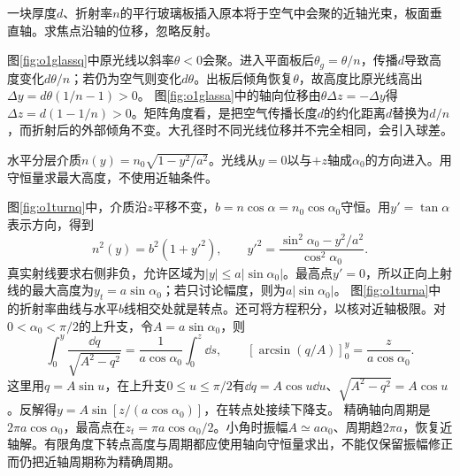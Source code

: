 \begin{exercise}\label{ex:o1glassplate}
一块厚度$d$、折射率$n$的平行玻璃板插入原本将于空气中会聚的近轴光束，板面垂直轴。求焦点沿轴的位移，忽略反射。
\end{exercise}
\begin{solution}
图\ref{fig:o1glassq}中原光线以斜率$\theta<0$会聚。进入平面板后$\theta_g=\theta/n$，传播$d$导致高度变化$d\theta/n$；若仍为空气则变化$d\theta$。出板后倾角恢复$\theta$，故高度比原光线高出$\Delta y=d\theta(1/n-1)>0$。
图\ref{fig:o1glassa}中的轴向位移由$\theta\Delta z=-\Delta y$得$\Delta z=d(1-1/n)>0$。矩阵角度看，是把空气传播长度$d$的约化距离$d$替换为$d/n$，而折射后的外部倾角不变。大孔径时不同光线位移并不完全相同，会引入球差。
\end{solution}

\begin{exercise}\label{ex:o1turning}
水平分层介质$n(y)=n_0\sqrt{1-y^2/a^2}$。光线从$y=0$以与$+z$轴成$\alpha_0$的方向进入。用守恒量求最大高度，不使用近轴条件。
\end{exercise}
\begin{solution}
图\ref{fig:o1turnq}中，介质沿$z$平移不变，$b=n\cos\alpha=n_0\cos\alpha_0$守恒。用$y'=\tan\alpha$表示方向，得到
\[
 n^2(y)=b^2(1+y'^2),\qquad
 y'^2=\frac{\sin^2\alpha_0-y^2/a^2}{\cos^2\alpha_0}.
\]
真实射线要求右侧非负，允许区域为$|y|\leq a|\sin\alpha_0|$。最高点$y'=0$，所以正向上射线的最大高度为$y_t=a\sin\alpha_0$；若只讨论幅度，则为$a|\sin\alpha_0|$。
图\ref{fig:o1turna}中的折射率曲线与水平$b$线相交处就是转点。还可将方程积分，以核对近轴极限。对$0<\alpha_0<\pi/2$的上升支，令$A=a\sin\alpha_0$，则
\[
 \int_0^{y}\frac{\dd q}{\sqrt{A^2-q^2}}
 =\frac1{a\cos\alpha_0}\int_0^z\dd s,\qquad
 [\arcsin(q/A)]_0^{y}=\frac{z}{a\cos\alpha_0}.
\]
这里用$q=A\sin u$，在上升支$0\leq u\leq\pi/2$有$\dd q=A\cos u\dd u$、$\sqrt{A^2-q^2}=A\cos u$。反解得$y=A\sin[z/(a\cos\alpha_0)]$，在转点处接续下降支。
精确轴向周期是$2\pi a\cos\alpha_0$，最高点在$z_t=\pi a\cos\alpha_0/2$。小角时振幅$A\simeq a\alpha_0$、周期趋$2\pi a$，恢复近轴解。有限角度下转点高度与周期都应使用轴向守恒量求出，不能仅保留振幅修正而仍把近轴周期称为精确周期。
\end{solution}

